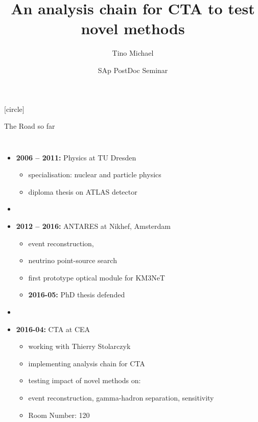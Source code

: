 \documentclass[8pt]{beamer}
\title{An analysis chain for CTA to test novel methods}
\author[Tino Michael]{Tino Michael\vspace{-12pt}}
\institute[CEA Saclay]{CEA Saclay, Irfu/SAp}
\date[\mydate]{SAp PostDoc Seminar\\\mydate}
\begin{document}
    [circle]


    \begin{frame}
        \titlepage
    \end{frame}

    
    \begin{frame}{The Road so far}
        \begin{columns}
                \begin{itemize}
                    \item[]\textbf{2006 -- 2011:} Physics at TU Dresden
                    \begin{itemize}
                        \item specialisation: nuclear and particle physics
                        \item diploma thesis on ATLAS detector
                    \end{itemize}

                    \item[]
                    \item[]\textbf{2012 -- 2016:} ANTARES at Nikhef, Amsterdam
                    \begin{itemize}
                        \item event reconstruction,
                        \item neutrino point-source search
                        \item first prototype optical module for KM3NeT
                        \item \textbf{2016-05:} PhD thesis defended
                    \end{itemize}
                    
                    \item[]
                    \item[]\textbf{2016-04:} CTA at CEA
                        \begin{itemize}
                            \item working with Thierry Stolarczyk
                            \item implementing analysis chain for CTA
                            \item testing impact of novel methods on:
                            \item event reconstruction, gamma-hadron separation, sensitivity
                            \item Room Number: 120
                        \end{itemize}
                \end{itemize}


\end{columns}
\end{frame}
\end{document}
